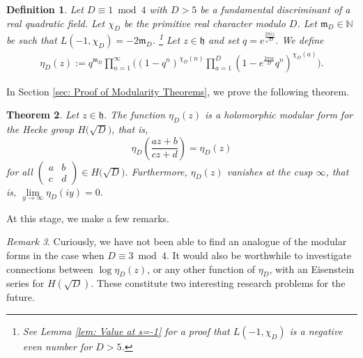 \documentclass[11pt]{amsart}
\numberwithin{equation}{section}
\newtheorem{thm}{Theorem}[section]
\newtheorem{defn}[thm]{Definition}
\theoremstyle{remark}
\newtheorem{rem}[thm]{Remark}
\begin{document}
\begin{defn} Let $D\equiv 1\bmod{4}$ with $D>5$ be a fundamental discriminant of a real quadratic field. Let $\chi_D$ be the primitive real character modulo $D$. Let $\mathfrak{m}_D \in \mathbb{N}$ be such that $L(-1,\chi_D)=-2\mathfrak{m}_D$. \footnote{See Lemma \ref{lem: Value at s=-1} for a proof that $L(-1,\chi_{D})$ is a negative even number for $D>5$.} Let $z\in\mathfrak h$ and set $q = e^{\frac{2\pi i z}{\sqrt{D}}}.$ We define
\begin{align}\label{Defn: etaD}
\eta_{D}(z) := q^{\mathfrak{m}_D}\prod_{n=1}^\infty \bigg(\left(1-q^n   \right)^{{\chi_{D}}(n)}  \prod_{a=1}^D \left(1-  e^{\frac{2\pi ia}{D}} q^n  \right)^{{\chi_{D}}(a)}\bigg).
\end{align}
\end{defn}

In Section \ref{sec: Proof of Modularity Theorems}, we prove the following theorem.
\begin{thm} \label{Theorem: D>5}
Let $z\in\mathfrak h$. The function $\eta_{D}(z)$ is a holomorphic modular form for the Hecke group $H\big(\sqrt{D}\big)$, that is,
$$\eta_{D}\left(\frac{az+b}{cz+d} \right) = \eta_{D}(z)$$
for all $\left(\begin{smallmatrix} a&b\\c&d\end{smallmatrix}\right)\in H\big(\sqrt{D}\big)$. Furthermore, $\eta_{D}(z)$ vanishes at the cusp  $\infty$, that is, $\lim\limits_{y\to\infty} \eta_{D}(iy) = 0.$
\end{thm} 

At this stage, we make a few remarks.
\begin{rem} Curiously, we have not been able to find an analogue of the modular forms in the case when $D\equiv 3\bmod 4$. It would also be worthwhile to investigate connections between $\log  \eta_{D}(z)$, or any other function of $\eta_{D}$, with an Eisenstein series for $H(\sqrt{D})$. These constitute two interesting research problems for the future.
\end{rem}
\end{document}

